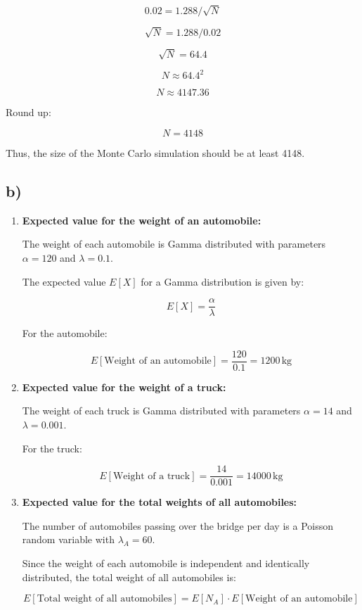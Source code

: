 \documentclass[12pt]{article}
\begin{document}
\[ 0.02 = 1.288 / \sqrt{N} \]

\[ \sqrt{N} = 1.288 / 0.02 \]

\[ \sqrt{N} = 64.4 \]

\[ N \approx 64.4^2 \]

\[ N \approx 4147.36 \]

Round up:

\[ N = 4148 \]

Thus, the size of the Monte Carlo simulation should be at least 4148.

\subsection*{b)} 

\begin{enumerate}
    \item \textbf{Expected value for the weight of an automobile:}
    
    The weight of each automobile is Gamma distributed with parameters \(\alpha = 120\) and \(\lambda = 0.1\).
    
    The expected value \( E[X] \) for a Gamma distribution is given by:
    
    \[
    E[X] = \frac{\alpha}{\lambda}
    \]
    
    For the automobile:
    
    \[
    E[\text{Weight of an automobile}] = \frac{120}{0.1} = 1200 \, \text{kg}
    \]
  
    \item \textbf{Expected value for the weight of a truck:}
    
    The weight of each truck is Gamma distributed with parameters \(\alpha = 14\) and \(\lambda = 0.001\).
    
    For the truck:
    
    \[
    E[\text{Weight of a truck}] = \frac{14}{0.001} = 14000 \, \text{kg}
    \]
  
    \item \textbf{Expected value for the total weights of all automobiles:}
    
    The number of automobiles passing over the bridge per day is a Poisson random variable with \(\lambda_A = 60\).
    
    Since the weight of each automobile is independent and identically distributed, the total weight of all automobiles is:
    
    \[
    E[\text{Total weight of all automobiles}] = E[N_A] \cdot E[\text{Weight of an automobile}]
    \]
    

\end{enumerate}
\end{document}
